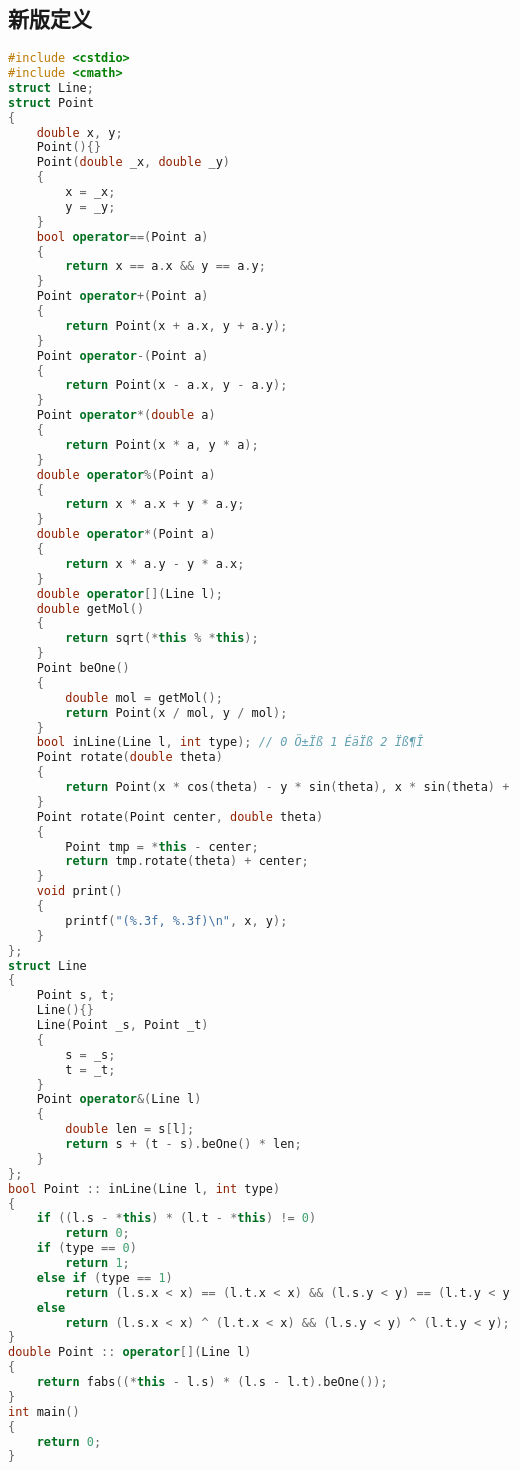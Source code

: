 \subsection{新版定义}
\begin{lstlisting}[language=c++]
#include <cstdio>
#include <cmath>
struct Line;
struct Point
{
	double x, y;
	Point(){}
	Point(double _x, double _y)
	{
		x = _x;
		y = _y;
	}
	bool operator==(Point a)
	{
		return x == a.x && y == a.y;
	}
	Point operator+(Point a)
	{
		return Point(x + a.x, y + a.y);
	}
	Point operator-(Point a)
	{
		return Point(x - a.x, y - a.y);
	}
	Point operator*(double a)
	{
		return Point(x * a, y * a);
	}
	double operator%(Point a)
	{
		return x * a.x + y * a.y;
	}
	double operator*(Point a)
	{
		return x * a.y - y * a.x;
	}
	double operator[](Line l);
	double getMol()
	{
		return sqrt(*this % *this);
	}
	Point beOne()
	{
		double mol = getMol();
		return Point(x / mol, y / mol);
	}
	bool inLine(Line l, int type); // 0 Ö±Ïß 1 ÉäÏß 2 Ïß¶Î
	Point rotate(double theta)
	{
		return Point(x * cos(theta) - y * sin(theta), x * sin(theta) + y * cos(theta));
	}
	Point rotate(Point center, double theta)
	{
		Point tmp = *this - center;
		return tmp.rotate(theta) + center;
	}
	void print()
	{
		printf("(%.3f, %.3f)\n", x, y);
	}
};
struct Line
{
	Point s, t;
	Line(){}
	Line(Point _s, Point _t)
	{
		s = _s;
		t = _t;
	}
	Point operator&(Line l)
	{
		double len = s[l];
		return s + (t - s).beOne() * len;
	}
};
bool Point :: inLine(Line l, int type)
{
	if ((l.s - *this) * (l.t - *this) != 0)
		return 0;
	if (type == 0)
		return 1;
	else if (type == 1)
		return (l.s.x < x) == (l.t.x < x) && (l.s.y < y) == (l.t.y < y);
	else
		return (l.s.x < x) ^ (l.t.x < x) && (l.s.y < y) ^ (l.t.y < y);
}
double Point :: operator[](Line l)
{
	return fabs((*this - l.s) * (l.s - l.t).beOne());
}
int main()
{
	return 0;
}
\end{lstlisting}
